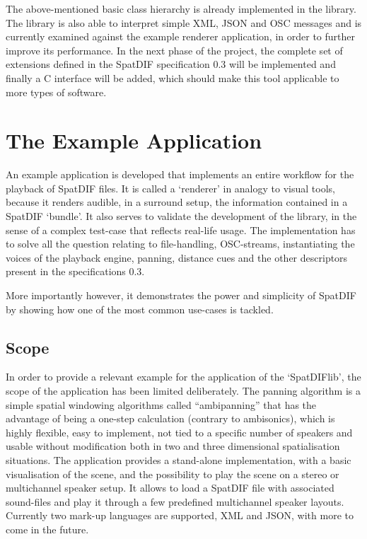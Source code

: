 \documentclass[a4paper]{article}
\begin{document}
The above-mentioned basic class hierarchy is already implemented in the library. 
The library is also able to interpret simple XML, JSON and OSC messages and is currently examined against the example renderer application, in order to further improve its performance.  
In the next phase of the project, the complete set of extensions defined in the SpatDIF specification 0.3 will be implemented and finally a C interface will be added, which should make this tool applicable to more types of software. 

\section{The Example Application}%

An example application is developed that implements an entire workflow for the playback of SpatDIF files. 
It is called a `renderer' in analogy to visual tools, because it renders audible, in a surround setup, the information contained in a SpatDIF `bundle'.
It also serves to validate the development of the library, in the sense of a complex test-case that reflects real-life usage.
The implementation has to solve all the question relating to file-handling, OSC-streams, instantiating the voices of the playback engine, panning, distance cues and the other descriptors present in the specifications 0.3.

More importantly however, it demonstrates the power and simplicity of SpatDIF by showing how one of the most common use-cases is tackled.

\subsection{Scope}

In order to provide a relevant example for the application of the `SpatDIFlib', the scope of the application has been limited deliberately.
The panning algorithm is a simple spatial windowing algorithms called ``ambipanning'' \cite{Neukom:2008ambipan} that has the advantage of being a one-step calculation (contrary to ambisonics), which is highly flexible, easy to implement, not tied to a specific number of speakers and usable without modification both in two and three dimensional spatialisation situations.
The application provides a stand-alone implementation, with a basic visualisation of the scene, and the possibility to play the scene on a stereo or multichannel speaker setup.
It allows to load a SpatDIF file with associated sound-files and play it through a few predefined multichannel speaker layouts.
Currently two mark-up languages are supported, XML and JSON, with more to come in the future.
\end{document}

